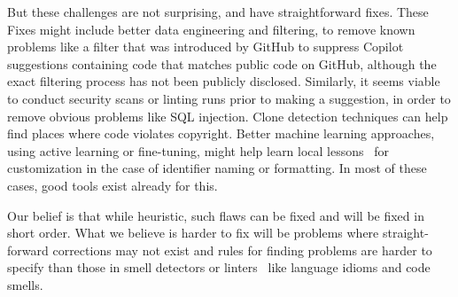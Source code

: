 But these challenges are not surprising, and have straightforward fixes. These Fixes might include better data engineering and filtering, to remove known problems like a filter that was introduced by GitHub to suppress Copilot suggestions containing code that matches public code on GitHub, although the exact filtering process has not been publicly disclosed.
Similarly, it seems viable to conduct security scans or linting runs prior to making a suggestion, in order to remove obvious problems like SQL injection. 
Clone detection techniques can help find places where code violates copyright. 
Better machine learning approaches, using active learning or fine-tuning, might help learn local lessons~\cite{Menzies2013} for customization in the case of identifier naming or formatting.
In most of these cases, good tools exist already for this. 

Our belief is that while heuristic, such flaws can be fixed and will be fixed in short order. 
What we believe is harder to fix will be problems where straight-forward corrections may not exist and rules for finding problems are harder to specify than those in smell detectors or linters~\cite{Ernst2017} like language idioms and code smells.

